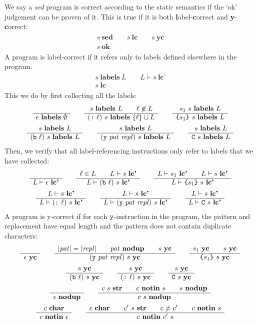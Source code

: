\documentclass[11pt]{article}
\newcommand\SED{\emph{sed}}
\newcommand\RULE[3][]{\begin{array}{c} #2 \\ \hline #3 \end{array}}
\newcommand\J[1]{\ensuremath{\textbf{#1}}}
\newcommand\cmd[1]{\ensuremath{\text{\texttt{#1}}}}
\renewcommand\arg[1]{\ensuremath{\mathit{#1}}}
\begin{document}
We say a \SED{} program is correct according to the static semantics if the `ok' judgement can be proven of it.
This is true if it is both \textbf{l}abel-\textbf{c}orrect and \textbf{y}-\textbf{c}orrect:
\begin{gather*}
	\RULE{s\ \J{sed} \qquad s\ \J{lc} \qquad s\ \J{yc}}{s\ \J{ok}}
\end{gather*}
A program is label-correct if it refers only to labels defined elsewhere in the program.
\begin{gather*}
	\RULE{s\ \J{labels}\ L \qquad L \vdash s\ \J{lc'}}{s\ \J{lc}}
\end{gather*}
This we do by first collecting all the labels:
\begin{gather*}
	\RULE{}{\epsilon\ \J{labels}\ \emptyset} \qquad
	\RULE{s\ \J{labels}\ L \qquad \ell \not\in L}{(\cmd{:}\ \ell)\ s\ \J{labels}\ \{\ell\} \cup L} \qquad
	\RULE{s_1\ s\ \J{labels}\ L}{\cmd{\{} s_1 \cmd{\}}\ s\ \J{labels}\ L} \\
%
	\RULE{s\ \J{labels}\ L}{(\cmd{b}\ \ell)\ s\ \J{labels}\ L} \qquad
	\RULE{s\ \J{labels}\ L}{(\cmd{y}\ \arg{pat}\ \arg{repl})\ s\ \J{labels}\ L} \qquad
	\RULE{s\ \J{labels}\ L}{\cmd{C}\ s\ \J{labels}\ L}
\end{gather*}
Then, we verify that all label-referencing instructions only refer to labels that we have collected:
\begin{gather*}
	\RULE{}{L \vdash \epsilon\ \J{lc'}} \qquad
	\RULE{\ell \in L \qquad L \vdash s\ \J{lc'}}{L \vdash (\cmd{b}\ \ell)\ s\ \J{lc'}} \qquad
	\RULE{L \vdash s_1\ \J{lc'} \qquad L \vdash s\ \J{lc'}}{L \vdash \cmd{\{} s_1 \cmd{\}}\ s\ \J{lc'}} \\
%
	\RULE{L \vdash s\ \J{lc'}}{L \vdash (\cmd{:}\ \ell)\ s\ \J{lc'}} \qquad
	\RULE{L \vdash s\ \J{lc'}}{L \vdash (\cmd{y}\ \arg{pat}\ \arg{repl})\ s\ \J{lc'}} \qquad
	\RULE{L \vdash s\ \J{lc'}}{L \vdash \cmd{C}\ s\ \J{lc'}}
\end{gather*}
A program is y-correct if for each \cmd{y}-instruction in the program, the pattern and replacement have equal length and the pattern does not contain duplicate characters:
\begin{gather*}
	\RULE{}{\epsilon\ \J{yc}} \qquad
	\RULE{|\arg{pat}| = |\arg{repl}| \qquad \arg{pat}\ \J{nodup} \qquad s\ \J{yc}}{(\cmd{y}\ \arg{pat}\ \arg{repl})\ s\ \J{yc}} \qquad
	\RULE{s_1\ \J{yc} \qquad s\ \J{yc}}{\cmd{\{} s_1 \cmd{\}}\ s\ \J{yc}} \\
%
	\RULE{s\ \J{yc}}{(\cmd{b}\ \ell)\ s\ \J{yc}} \qquad
	\RULE{s\ \J{yc}}{(\cmd{:}\ \ell)\ s\ \J{yc}} \qquad
	\RULE{s\ \J{yc}}{\cmd{C}\ s\ \J{yc}} \\
	\RULE{}{\epsilon\ \J{nodup}} \qquad
	\RULE{c\ s\ \J{str} \qquad c\ \J{notin}\ s \qquad s\ \J{nodup}}{c\ s\ \J{nodup}} \\
	\RULE{c\ \J{char}}{c\ \J{notin}\ \epsilon} \qquad
	\RULE{c\ \J{char} \qquad c'\ s\ \J{str} \qquad c \not= c' \qquad c\ \J{notin}\ s}{c\ \J{notin}\ c'\ s}
\end{gather*}
\end{document}
